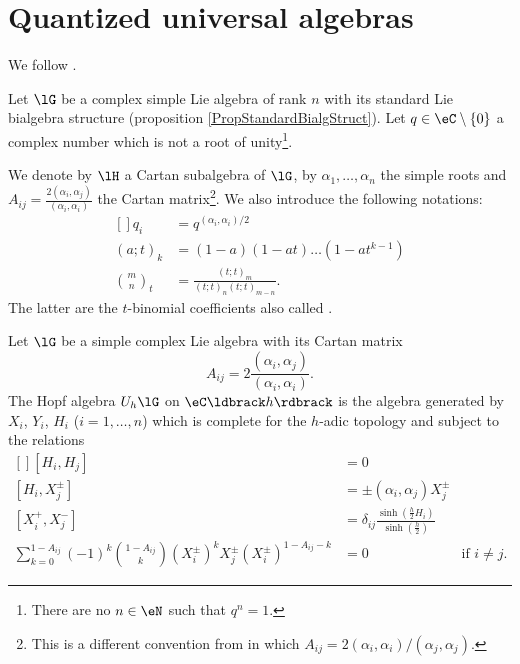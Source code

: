 \section{Quantized universal algebras}

We follow \cite{SoibelmanI}.

Let \( \lG\) be a complex simple Lie algebra of rank \( n\) with its standard Lie bialgebra structure (proposition \ref{PropStandardBialgStruct}). Let \( q\in\eC\setminus\{ 0 \}\) a complex number which is not a root of unity\footnote{There are no \( n\in\eN\) such that \( q^n=1\).}.

We denote by \( \lH\) a Cartan subalgebra of \( \lG \), by \( \alpha_1,\ldots,\alpha_n\) the simple roots and \( A_{ij}=\frac{ 2(\alpha_i,\alpha_j) }{ (\alpha_i,\alpha_i) }\) the Cartan matrix\footnote{This is a different convention from \cite{SoibelmanI} in which \( A_{ij}=2(\alpha_i,\alpha_i)/(\alpha_j,\alpha_j)\).}. We also introduce the following notations:
\begin{equation}
    \begin{aligned}[]
        q_i&=q^{(\alpha_i,\alpha_i)/2}\\
        (a;t)_k&=(1-a)(1-at)\ldots (1-at^{k-1})\\
        \binom{m}{n}_t&=\frac{ (t;t)_m }{ (t;t)_n(t;t)_{m-n} }.
    \end{aligned}
\end{equation}
The latter are the \( t\)-binomial coefficients also called .

\begin{definition}
    Let \( \lG\) be a simple complex Lie algebra with its Cartan matrix 
    \begin{equation}
        A_{ij}=2\frac{ (\alpha_i,\alpha_j) }{ (\alpha_i,\alpha_i) }.
    \end{equation}
    The Hopf algebra \( U_h\lG\) on \( \eC\ldbrack h\rdbrack \) is the algebra generated by \( X_i\), \( Y_i\), \( H_i\) (\( i=1,\ldots,n\)) which is complete for the \( h\)-adic topology and subject to the relations
    \begin{equation}
        \begin{aligned}[]
            [H_i,H_j]&=0\\
            [H_i,X^{\pm}_j]&=\pm(\alpha_i,\alpha_j)X^{\pm}_j\\
            [X_i^+,X_j^-]&=\delta_{ij}\frac{ \sinh\left( \frac{ h }{2}H_i \right) }{ \sinh\left( \frac{ h }{2} \right) }\\
            \sum_{k=0}^{1-A_{ij}}(-1)^k\binom{1-A_{ij}}{k}(X_i^{\pm})^kX_j^{\pm}(X_i^{\pm})^{1-A_{ij}-k}&=0 &   \text{if } i\neq j.
        \end{aligned}
    \end{equation}
    
\end{definition}

